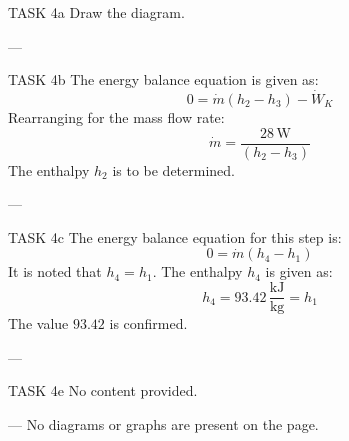 TASK 4a  
Draw the diagram.

---

TASK 4b  
The energy balance equation is given as:  
\[
0 = \dot{m} (h_2 - h_3) - \dot{W}_K
\]  
Rearranging for the mass flow rate:  
\[
\dot{m} = \frac{28 \, \text{W}}{(h_2 - h_3)}
\]  
The enthalpy \( h_2 \) is to be determined.

---

TASK 4c  
The energy balance equation for this step is:  
\[
0 = \dot{m} (h_4 - h_1)
\]  
It is noted that \( h_4 = h_1 \).  
The enthalpy \( h_4 \) is given as:  
\[
h_4 = 93.42 \, \frac{\text{kJ}}{\text{kg}} = h_1
\]  
The value \( 93.42 \) is confirmed.

---

TASK 4e  
No content provided.  

---  
No diagrams or graphs are present on the page.